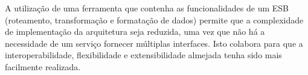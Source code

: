 A utilização de uma ferramenta que contenha as funcionalidades de um ESB (roteamento, transformação e formatação de dados) permite que a complexidade de implementação da arquitetura seja reduzida, uma vez que não há a necessidade de um serviço fornecer múltiplas interfaces. Isto colabora para que a interoperabilidade, flexibilidade e extensibilidade almejada tenha sido mais facilmente realizada.

